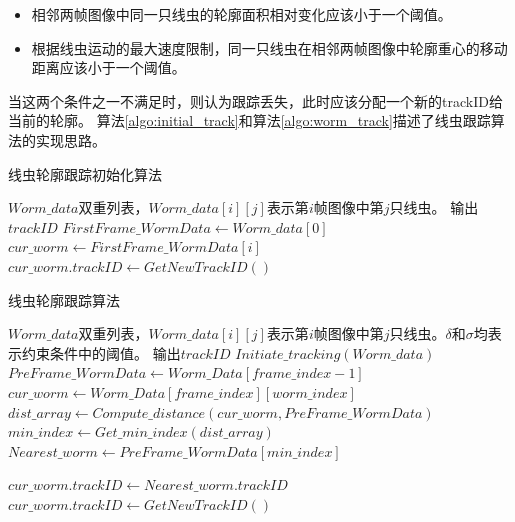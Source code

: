 	\begin{itemize}
	  \item 相邻两帧图像中同一只线虫的轮廓面积相对变化应该小于一个阈值。
	  \item 根据线虫运动的最大速度限制，同一只线虫在相邻两帧图像中轮廓重心的移动距离应该小于一个阈值。
	\end{itemize}
	当这两个条件之一不满足时，则认为跟踪丢失，此时应该分配一个新的trackID给当前的轮廓。
	算法\ref{algo:initial_track}和算法\ref{algo:worm_track}描述了线虫跟踪算法的实现思路。
\begin{algorithm}
\caption{线虫轮廓跟踪初始化算法}
\label{algo:initial_track}
\begin{algorithmic}[1]
	\Require $Worm\_data$双重列表，$Worm\_data[i][j]$表示第$i$帧图像中第$j$只线虫。
	\Ensure 输出$trackID$
		\State $FirstFrame\_WormData \gets Worm\_data[0]$
			\State $cur\_worm \gets FirstFrame\_WormData[i]$
			\State $cur\_worm.trackID \gets GetNewTrackID()$
		\EndFor
\EndFunction
\end{algorithmic}
\end{algorithm}

\begin{algorithm}[H]
\caption{线虫轮廓跟踪算法}
\label{algo:worm_track}
\begin{algorithmic}[1]
	\Require $Worm\_data$双重列表，$Worm\_data[i][j]$表示第$i$帧图像中第$j$只线虫。$\delta$和$\sigma$均表示约束条件中的阈值。
	\Ensure 输出$trackID$
		\State $Initiate\_tracking(Worm\_data)$
			\State $PreFrame\_WormData \gets Worm\_Data[frame\_index-1] $
				\State $cur\_worm \gets Worm\_Data[frame\_index][worm\_index]$
				\State $dist\_array \gets Compute\_distance(cur\_worm,PreFrame\_WormData)$
				\State $min\_index \gets Get\_min\_index(dist\_array)$
				\State $Nearest\_worm \gets PreFrame\_WormData[min\_index]$
\end{algorithmic}
\end{algorithm}
\begin{algorithm}[H]
\begin{algorithmic}[1]
					\State $cur\_worm.trackID \gets Nearest\_worm.trackID$
				\Else
					\State $cur\_worm.trackID \gets GetNewTrackID( )$
				\EndIf
			\EndFor
		\EndFor
\EndFunction
\end{algorithmic}
\end{algorithm}
